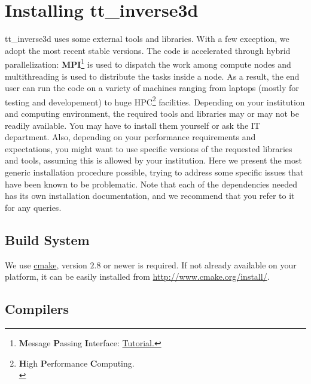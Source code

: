 \documentclass[twoside,final,onecolumn]{article}
\newcommand{\MPI}{\textbf{MPI}}
\begin{document}
\section{Installing tt\_inverse3d}

tt\_inverse3d uses some external tools and libraries. With a few exception, we adopt the most recent stable versions. The code is accelerated through hybrid parallelization: \MPI\footnote{{\textbf{M}essage \textbf{P}assing \textbf{I}nterface}: \href{https://computing.llnl.gov/tutorials/mpi} {Tutorial.}}
is used to dispatch the work among compute nodes and multithreading is used to distribute the tasks inside a node.
As a result, the end user can run the code on a variety of machines ranging from laptops (mostly for testing and developement) to huge HPC\footnote{{\bf H}igh {\bf P}erformance {\bf C}omputing.\\} facilities.
\newline
\newline
Depending on your institution and computing environment, the required tools and libraries may or may not be readily available.
You may have to install them yourself or ask the IT department. 
Also, depending on your performance requirements and expectations, you might want to use specific versions of the requested libraries and tools, assuming this is allowed by your institution.
\newline
Here we present the most generic installation procedure possible, trying to address some specific issues that have been known to be problematic. 
Note that each of the dependencies needed has its own installation documentation, and we recommend that you refer to it for any queries.

\subsection{Build System}

We use \href{http://www.cmake.org/}{cmake}, version $2.8$ or newer is required. If not already available on your platform, it can be easily installed from \href{http://www.cmake.org/install/}{http://www.cmake.org/install/}.

\subsection{Compilers}
\end{document}
